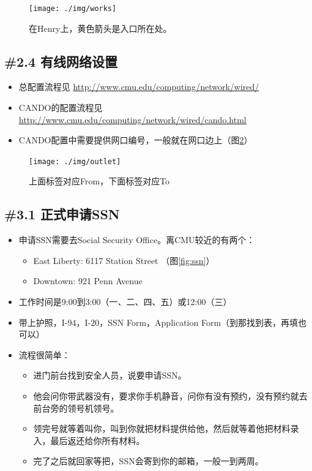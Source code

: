 \documentclass[letterpaper,10pt]{article}
\begin{document}
	\begin{figure}[!h]
		\centering
		\texttt{[image: ./img/works]}
		\caption{在Henry上，黄色箭头是入口所在处。}
		\label{fig:works}
	\end{figure}
	
	\subsection*{\#2.4 有线网络设置}
	
	\begin{itemize}
		\item 总配置流程见 \url{http://www.cmu.edu/computing/network/wired/}
		\item CANDO的配置流程见 \url{http://www.cmu.edu/computing/network/wired/cando.html}
		\item CANDO配置中需要提供网口编号，一般就在网口边上（图\ref{fig:outlet}）
	\end{itemize}
	
	\begin{figure}[!h]
		\centering
		\texttt{[image: ./img/outlet]}
		\caption{上面标签对应From，下面标签对应To}
		\label{fig:outlet}
	\end{figure}
	
	\subsection*{\#3.1 正式申请SSN}
	
	\begin{itemize}
		\item 申请SSN需要去Social Security Office。离CMU较近的有两个：
		\begin{itemize}
			\item East Liberty: 6117 Station Street （图\ref{fig:ssn}）
			\item Downtown: 921 Penn Avenue
		\end{itemize}
		\item 工作时间是9:00到3:00（一、二、四、五）或12:00（三）
		\item 带上护照，I-94，I-20，SSN Form，Application Form（到那找到表，再填也可以）
		\item 流程很简单：
		\begin{itemize}
			\item 进门前台找到安全人员，说要申请SSN。
			\item 他会问你带武器没有，要求你手机静音，问你有没有预约，没有预约就去前台旁的领号机领号。
			\item 领完号就等着叫你，叫到你就把材料提供给他，然后就等着他把材料录入，最后返还给你所有材料。
			\item 完了之后就回家等把，SSN会寄到你的邮箱，一般一到两周。
		\end{itemize}
	\end{itemize}
	
\end{document}
